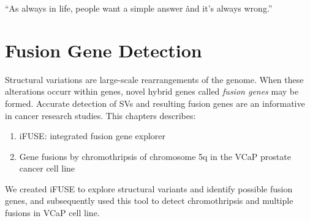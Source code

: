 \begin{savequote}[75mm]
“As always in life, people want a simple answer \. \. \. and it’s always wrong.”
\end{savequote}

\chapter{Fusion Gene Detection}\label{chapter:fusiongenes}
\setcounter{figure}{-1}
\setcounter{table}{-1}
\setcounter{section}{-1}

Structural variations are large-scale rearrangements of the genome. When these alterations occurr within genes, novel hybrid genes called \emph{fusion genes} may be formed. Accurate detection of SVs and resulting fusion genes are an informative in cancer research studies. This chapters describes:

\begin{enumerate}
\item iFUSE: integrated fusion gene explorer
\item Gene fusions by chromothripsis of chromosome 5q in the VCaP prostate cancer cell line
\end{enumerate}

We created iFUSE to explore structural variants and identify possible fusion genes, and subsequently used this tool to detect chromothripsis and multiple fusions in VCaP cell line.

